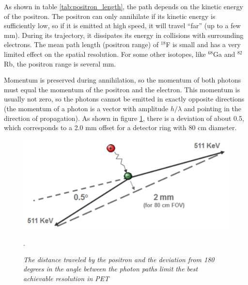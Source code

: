 As shown in table \ref{tab:positron_length}, the path depends on the
kinetic energy of the positron. The positron can only annihilate if
its kinetic energy is sufficiently low, so if it is emitted at high
speed, it will travel ``far'' (up to a few mm). During its trajectory,
it dissipates its energy in collisions with surrounding electrons. The
mean path length (positron range) of $^{18}$F is small and has a very
limited effect on the spatial resolution. For some other isotopes,
like $^{68}$Ga and $^{82}$Rb, the positron range is several mm.

Momentum is preserved during annihilation, so the momentum of both photons
must equal the momentum of the positron and the electron. This momentum is
usually not zero, so the photons cannot be emitted in exactly opposite
directions (the momentum of a photon is a vector with amplitude $h/\lambda$
and pointing in the direction of propagation). As shown in figure
\ref{fig:positron_error}, there is a deviation of about 0.5\textdegree, which
corresponds to a 2.0 mm offset for a detector ring with 80 cm diameter.
%
\begin{figure}[tb]
\centering
\includegraphics[width=\figone]{figs/fig_positron_error.pdf}
\caption{\label{fig:positron_error} \emph{The distance traveled by the
positron and the deviation from 180 degrees in the angle between the photon
paths limit the best achievable resolution in PET}}.
\end{figure}


